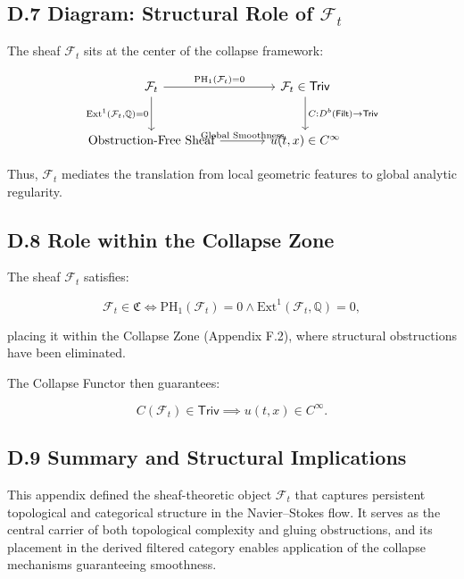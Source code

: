 \documentclass[11pt]{article}
\begin{document}
\subsection*{D.7 Diagram: Structural Role of \( \mathcal{F}_t \)}

The sheaf \( \mathcal{F}_t \) sits at the center of the collapse framework:

\[
\begin{tikzcd}[row sep=large, column sep=large]
\mathcal{F}_t
  \arrow[r, "{\mathrm{PH}_1(\mathcal{F}_t) = 0}"]
  \arrow[d, "{\mathrm{Ext}^1(\mathcal{F}_t, \mathbb{Q}) = 0}"']
& \mathcal{F}_t \in \mathsf{Triv}
  \arrow[d, "{C: D^b(\mathsf{Filt}) \to \mathsf{Triv}}"] \\
\text{Obstruction-Free Sheaf}
  \arrow[r, "{\text{Global Smoothness}}"]
& u(t, x) \in C^\infty
\end{tikzcd}
\]

Thus, \( \mathcal{F}_t \) mediates the translation from local geometric features to global analytic regularity.

\subsection*{D.8 Role within the Collapse Zone}

The sheaf \( \mathcal{F}_t \) satisfies:

\[
\mathcal{F}_t \in \mathfrak{C} \iff \mathrm{PH}_1(\mathcal{F}_t) = 0 \land \mathrm{Ext}^1(\mathcal{F}_t, \mathbb{Q}) = 0,
\]

placing it within the Collapse Zone (Appendix F.2), where structural obstructions have been eliminated.

The Collapse Functor then guarantees:

\[
C(\mathcal{F}_t) \in \mathsf{Triv} \implies u(t, x) \in C^\infty.
\]

\subsection*{D.9 Summary and Structural Implications}

This appendix defined the sheaf-theoretic object \( \mathcal{F}_t \) that captures persistent topological and categorical structure in the Navier–Stokes flow.  
It serves as the central carrier of both topological complexity and gluing obstructions, and its placement in the derived filtered category enables application of the collapse mechanisms guaranteeing smoothness.
\end{document}
